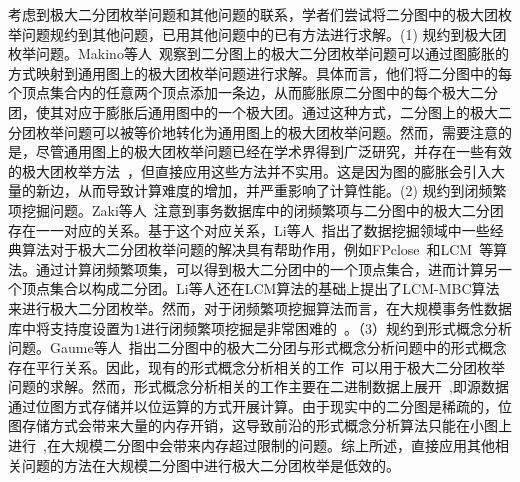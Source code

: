 考虑到极大二分团枚举问题和其他问题的联系，学者们尝试将二分图中的极大团枚举问题规约到其他问题，已用其他问题中的已有方法进行求解。(1) 规约到极大团枚举问题。Makino等人~\cite{Makino04}观察到二分图上的极大二分团枚举问题可以通过图膨胀的方式映射到通用图上的极大团枚举问题进行求解。具体而言，他们将二分图中的每个顶点集合内的任意两个顶点添加一条边，从而膨胀原二分图中的每个极大二分团，使其对应于膨胀后通用图中的一个极大团。通过这种方式，二分图上的极大二分团枚举问题可以被等价地转化为通用图上的极大团枚举问题。然而，需要注意的是，尽管通用图上的极大团枚举问题已经在学术界得到广泛研究，并存在一些有效的极大团枚举方法~\cite{MCEparallel20,MCE20,MCE22}，但直接应用这些方法并不实用。这是因为图的膨胀会引入大量的新边，从而导致计算难度的增加，并严重影响了计算性能。(2) 规约到闭频繁项挖掘问题。Zaki等人~\cite{CFI98}注意到事务数据库中的闭频繁项与二分图中的极大二分团存在一一对应的关系。基于这个对应关系，Li等人~\cite{correspondence05}指出了数据挖掘领域中一些经典算法对于极大二分团枚举问题的解决具有帮助作用，例如FPclose~\cite{fpclose04}和LCM~\cite{lcm04}等算法。通过计算闭频繁项集，可以得到极大二分团中的一个顶点集合，进而计算另一个顶点集合以构成二分团。Li等人还在LCM算法的基础上提出了LCM-MBC算法来进行极大二分团枚举。然而，对于闭频繁项挖掘算法而言，在大规模事务性数据库中将支持度设置为1进行闭频繁项挖掘是非常困难的~\cite{iMBEA14}。（3）规约到形式概念分析问题。Gaume等人~\cite{fcambe10}指出二分图中的极大二分团与形式概念分析问题中的形式概念存在平行关系。因此，现有的形式概念分析相关的工作~\cite{FCA15,FCA21,FCA22}可以用于极大二分团枚举问题的求解。然而，形式概念分析相关的工作主要在二进制数据上展开~\cite{FCA15},即源数据通过位图方式存储并以位运算的方式开展计算。由于现实中的二分图是稀疏的，位图存储方式会带来大量的内存开销，这导致前沿的形式概念分析算法只能在小图上进行~\cite{FCA21,FCA22},在大规模二分图中会带来内存超过限制的问题。综上所述，直接应用其他相关问题的方法在大规模二分图中进行极大二分团枚举是低效的。


